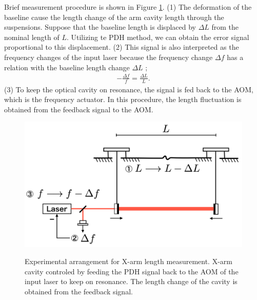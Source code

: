 Brief measurement procedure is shown in Figure \ref{img:img600}. (1) The deformation of the baseline cause the length change of the arm cavity length through the suspensions. Suppose that the baseline length is displaced by $\Delta{L}$ from the nominal length
of $L$. Utilizing te PDH method, we can obtain the error signal proportional to this displacement. (2) This signal is also interpreted as the frequency changes of the input laser because the frequency change $\Delta{f}$ has a relation with the baseline length change $\Delta{L}$ \cite{izumi2012multi};
\begin{eqnarray}
  \displaystyle -\frac{\Delta{f}}{f} = \frac{\Delta{L}}{L}.
\end{eqnarray}
(3) To keep the optical cavity on resonance, the signal is fed back to the AOM, which is the frequency actuator. In this procedure, the length fluctuation is obtained from the feedback signal to the AOM.
\begin{figure}[h]
  \centering
  \includegraphics[width=13cm]{./img_chap6/img600.png}\label{img:img600}
  \caption{Experimental arrangement for X-arm length measurement. X-arm cavity controled by feeding the PDH signal back to the AOM of the input laser to keep on resonance. The length change of the cavity is obtained from the feedback signal.}
\end{figure}



